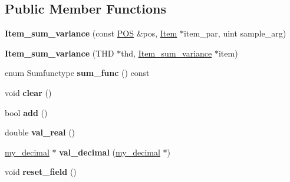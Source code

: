 \subsection*{Public Member Functions}
\begin{DoxyCompactItemize}
\item 
\mbox{\label{classItem__sum__variance_aa0b179baa2bccb8a20ea34f7ee2ce039}} 
{\bfseries Item\+\_\+sum\+\_\+variance} (const \mbox{\hyperlink{structYYLTYPE}{P\+OS}} \&pos, \mbox{\hyperlink{classItem}{Item}} $\ast$item\+\_\+par, uint sample\+\_\+arg)
\item 
\mbox{\label{classItem__sum__variance_a9de6e7a5acd82e26cde06f8d98c500eb}} 
{\bfseries Item\+\_\+sum\+\_\+variance} (T\+HD $\ast$thd, \mbox{\hyperlink{classItem__sum__variance}{Item\+\_\+sum\+\_\+variance}} $\ast$item)
\item 
\mbox{\label{classItem__sum__variance_adda0e8b137a758939c98734de267a5fd}} 
enum Sumfunctype {\bfseries sum\+\_\+func} () const
\item 
\mbox{\label{classItem__sum__variance_a7a5ee2016d5e7bbef467f7d7e81b82b9}} 
void {\bfseries clear} ()
\item 
\mbox{\label{classItem__sum__variance_a3d69914fdbb0c2fcc74029a79b77bb48}} 
bool {\bfseries add} ()
\item 
\mbox{\label{classItem__sum__variance_a213317e8bfb6eac2c06e47b457edab9e}} 
double {\bfseries val\+\_\+real} ()
\item 
\mbox{\label{classItem__sum__variance_ada2d35d3c2723d313da762185e097aa6}} 
\mbox{\hyperlink{classmy__decimal}{my\+\_\+decimal}} $\ast$ {\bfseries val\+\_\+decimal} (\mbox{\hyperlink{classmy__decimal}{my\+\_\+decimal}} $\ast$)
\item 
\mbox{\label{classItem__sum__variance_aa87c6108a45a80f4763a9f400dfce39b}} 
void {\bfseries reset\+\_\+field} ()
\item 
\mbox{\label{classItem__sum__variance_a4c922e0ed8abf034a9001030bd3c9c8e}} 

\end{DoxyCompactItemize}
